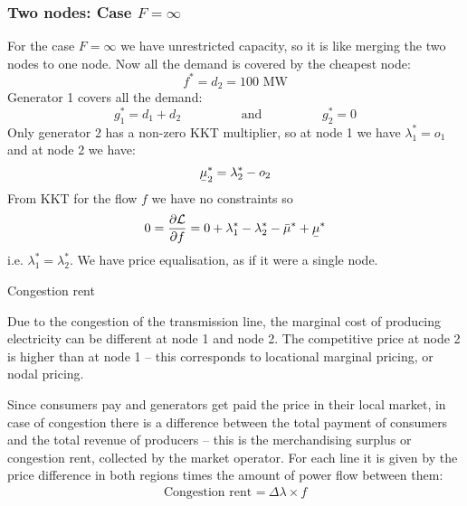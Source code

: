 \documentclass[10pt,aspectratio=169,dvipsnames]{beamer}
\def\l{\lambda}
\def\m{\mu}
\def\d{\partial}
\def\cL{\mathcal{L}}
\newcommand{\ubar}[1]{\text{\b{$#1$}}}
\begin{document}
\begin{frame}[fragile]
  \frametitle{Two nodes: Case $F = \infty$ }

  For the case $F = \infty$ we have unrestricted capacity, so it is
  like merging the two nodes to one node. Now all the demand is
  covered by the cheapest node:
  \begin{equation*}
    f^* = d_2 = 100\textrm{ MW}
  \end{equation*}
  Generator 1 covers all the demand:
  \begin{equation*}
    g_1^* = d_1+d_2  \hspace{2cm} \textrm{and} \hspace{2cm} g_2^* = 0
  \end{equation*}
  Only generator 2 has a non-zero KKT multiplier, so at node 1 we have
  $\l_1^* =o_1$ and at node 2 we have:
  \begin{equation*}
   \ubar{\m}_2^* = \l_2^* - o_2
  \end{equation*}
  From KKT for the flow $f$ we have no constraints so
  \begin{equation*}
    0 = \frac{\d \cL}{\d f} = 0 +  \l_1^* - \l_2^*  -  \bar{\m}^* + \ubar{\m}^*
  \end{equation*}
  i.e. $\l_1^* = \l_2^*$. We have price equalisation, as if it were a single node.

\end{frame}


\begin{frame}{Congestion rent}

Due to the congestion of the transmission line, the marginal cost of producing electricity can be different at node 1 and node 2. The competitive price at node 2 is higher than at node 1 -- this corresponds to \alert{locational marginal pricing}, or \alert{nodal pricing}.

Since consumers pay and generators get paid the price in their local market, in case of congestion there is a difference between the total payment of consumers and the total revenue of producers -- this is the \alert{merchandising surplus} or \alert{congestion rent}, collected by the market operator. For each line it is given by the price difference in both regions times the amount of power flow between them:
\begin{align*}
\text{Congestion rent =}\:\Delta \lambda\times f
\end{align*}


\end{frame}
\end{document}
